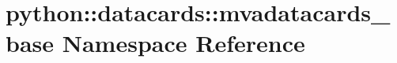 \hypertarget{namespacepython_1_1datacards_1_1mvadatacards__base}{
\section{python::datacards::mvadatacards\_\-base Namespace Reference}
\label{namespacepython_1_1datacards_1_1mvadatacards__base}
}
